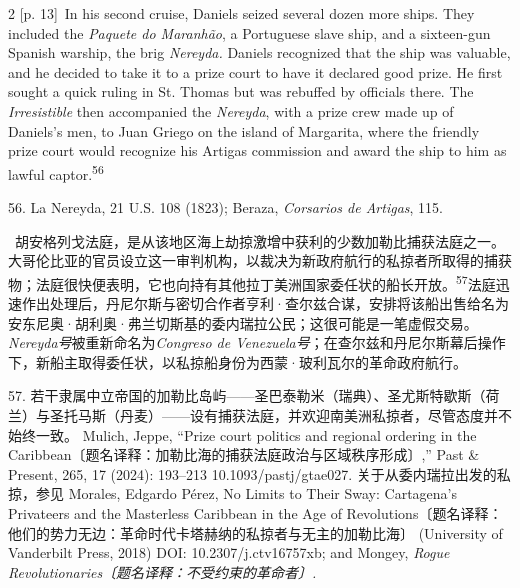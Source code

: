 \documentclass[10pt,a4paper]{article}
\begin{document}
\begin{paracol}{2}
\switchcolumn
{\scriptsize\color{gray} [p. 13]}\ In his second cruise, Daniels seized several dozen more ships. They included the \textit{Paquete do Maranhão}, a Portuguese slave ship, and a sixteen-gun Spanish warship, the brig \textit{Nereyda.} Daniels recognized that the ship was valuable, and he decided to take it to a prize court to have it declared good prize. He first sought a quick ruling in St. Thomas but was rebuffed by officials there. The \textit{Irresistible} then accompanied the \textit{Nereyda}, with a prize crew made up of Daniels’s men, to Juan Griego on the island of Margarita, where the friendly prize court would recognize his Artigas commission and award the ship to him as lawful captor.\nobreak\textsuperscript{56}\par{\small 56. La Nereyda, 21 U.S. 108 (1823); Beraza, \textit{Corsarios de Artigas}, 115.\par}
\switchcolumn*
{\scriptsize\color{gray} [p. 14]}\ 胡安格列戈法庭，是从该地区海上劫掠激增中获利的少数加勒比捕获法庭之一。大哥伦比亚的官员设立这一审判机构，以裁决为新政府航行的私掠者所取得的捕获物；法庭很快便表明，它也向持有其他拉丁美洲国家委任状的船长开\mbox{放。\textsuperscript{57}}法庭迅速作出处理后，丹尼尔斯与密切合作者亨利·查尔兹合谋，安排将该船出售给名为安东尼奥·胡利奥·弗兰切斯基的委内瑞拉公民；这很可能是一笔虚假交易。\textit{Nereyda号}被重新命名为\textit{Congreso de Venezuela号}；在查尔兹和丹尼尔斯幕后操作下，新船主取得委任状，以私掠船身份为西蒙·玻利瓦尔的革命政府航行。\par{\small 57. 若干隶属中立帝国的加勒比岛屿——圣巴泰勒米（瑞典）、圣尤斯特歇斯（荷兰）与圣托马斯（丹麦）——设有捕获法庭，并欢迎南美洲私掠者，尽管态度并不始终一致。 Mulich, Jeppe, “Prize court politics and regional ordering in the Caribbean〔题名译释：加勒比海的捕获法庭政治与区域秩序形成〕,” Past \& Present, 265, 17 (2024): 193–213 10.1093/pastj/gtae027. 关于从委内瑞拉出发的私掠，参见 Morales, Edgardo Pérez, No Limits to Their Sway: Cartagena’s Privateers and the Masterless Caribbean in the Age of Revolutions〔题名译释：他们的势力无边：革命时代卡塔赫纳的私掠者与无主的加勒比海〕 (University of Vanderbilt Press, 2018) DOI: 10.2307/j.ctv16757xb; and Mongey, \textit{Rogue Revolutionaries〔题名译释：不受约束的革命者〕.}\par}
\switchcolumn

\end{paracol}
\end{document}
